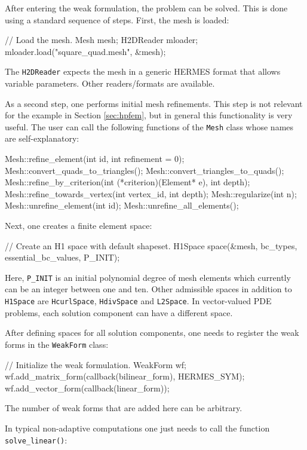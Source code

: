 \documentclass[final,3p,times,twocolumn]{elsarticle}
\begin{document}
After entering the weak formulation, the problem 
can be solved. This is done using a standard sequence 
of steps. First, the mesh is loaded:

\begin{code}
  // Load the mesh.
  Mesh mesh;
  H2DReader mloader;
  mloader.load("square_quad.mesh", &mesh);
\end{code}
The {\tt H2DReader} expects the mesh in a generic
HERMES format that allows variable parameters. 
Other readers/formats are available. 

As a second step, one performs initial mesh refinements. This
step is not relevant for the example in Section 
\ref{sec:hpfem}, but in general this functionality 
is very useful. The user can call the following 
functions of the {\tt Mesh} class whose names are 
self-explanatory:

\begin{code}
Mesh::refine_element(int id, int refinement = 0);
Mesh::convert_quads_to_triangles();
Mesh::convert_triangles_to_quads();
Mesh::refine_by_criterion(int (*criterion)(Element* e), 
                          int depth);
Mesh::refine_towards_vertex(int vertex_id, int depth);
Mesh::regularize(int n);
Mesh::unrefine_element(int id);
Mesh::unrefine_all_elements();
\end{code}
Next, one creates a finite element space:
\begin{code}
  // Create an H1 space with default shapeset.
  H1Space space(&mesh, bc_types, essential_bc_values, 
                P_INIT);
\end{code}
Here, {\tt P\_INIT} is an initial polynomial degree 
of mesh elements which currently can be an integer
between one and ten. Other admissible spaces in
addition to {\tt H1Space} are {\tt HcurlSpace},
{\tt HdivSpace} and {\tt L2Space}. In vector-valued
PDE problems, each solution component can have 
a different space.

After defining spaces for all solution components, 
one needs to register the weak forms in the {\tt WeakForm}
class:

\begin{code}
  // Initialize the weak formulation.
  WeakForm wf;
  wf.add_matrix_form(callback(bilinear_form), HERMES_SYM);
  wf.add_vector_form(callback(linear_form));
\end{code}
The number of weak forms that are added here 
can be arbitrary. 

In typical non-adaptive computations one just needs 
to call the function {\tt solve\_linear()}:
\end{document}
